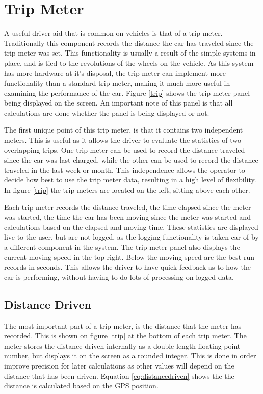 

\section{Trip Meter}

A useful driver aid that is common on vehicles is that of a trip meter. Traditionally this component records the distance the car has traveled since the trip meter was set. This functionality is usually a result of the simple systems in place, and is tied to the revolutions of the wheels on the vehicle. As this system has more hardware at it's disposal, the trip meter can implement more functionality than a standard trip meter, making it much more useful in examining the performance of the car. Figure \ref{trip} shows the trip meter panel being displayed on the screen. An important note of this panel is that all calculations are done whether the panel is being displayed or not.


The first unique point of this trip meter, is that it contains two independent meters. This is useful as it allows the driver to evaluate the statistics of two overlapping trips. One trip meter can be used to record the distance traveled since the car was last charged, while the other can be used to record the distance traveled in the last week or month. This independence allows the operator to decide how best to use the trip meter data, resulting in a high level of flexibility. In figure \ref{trip} the trip meters are located on the left, sitting above each other.

Each trip meter records the distance traveled, the time elapsed since the meter was started, the time the car has been moving since the meter was started and calculations based on the elapsed and moving time. These statistics are displayed live to the user, but are not logged, as the logging functionality  is taken car of by a different component in the system. The trip meter panel also displays the current moving speed in the top right. Below the moving speed are the best run records in seconds. This allows the driver to have quick feedback as to how the car is performing, without having to do lots of processing on logged data.

\subsection{Distance Driven}
\label{sec:distancedriven}
The most important part of a trip meter, is the distance that the meter has recorded. This is shown on figure \ref{trip} at the bottom of each trip meter. The meter stores the distance driven internally as a double length floating point number, but displays it on the screen as a rounded integer. This is done in order improve precision for later calculations as other values will depend on the distance that has been driven. Equation \ref{eq:distancedriven} shows the the distance is calculated based on the GPS position.

